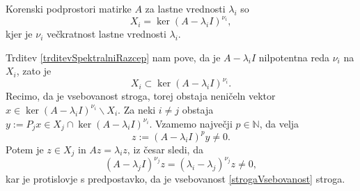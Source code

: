 \documentclass[mat1]{fmfdelo}
\newcommand{\N}{\mathbb N}
\begin{document}
\begin{trditev}
    Korenski podprostori matirke $A$ za lastne vrednosti $\lambda_i$ so
    \begin{equation}
        X_i = \ker (A - \lambda_i I)^{\nu_i},
    \end{equation}
    kjer je $\nu_i$ večkratnost lastne vrednosti $\lambda_i$.
\end{trditev}
\begin{dokaz}
    Trditev \ref{trditevSpektralniRazcep} nam pove, da je $A - \lambda_i I$ nilpotentna reda $\nu_i$ na $X_i$, zato je
    \begin{equation} \label{strogaVsebovanost}
        X_i \subset \ker (A - \lambda_i I)^{\nu_i}.
    \end{equation}
    Recimo, da je vsebovanost stroga, torej obstaja neničeln vektor $x \in \ker (A - \lambda_i I)^{\nu_i} \backslash X_i$. Za neki $i \neq j$ obstaja $y := P_j x \in X_j \cap \ker (A - \lambda_i I)^{\nu_i}$. Vzamemo največji $p \in \N$, da velja
    \begin{equation}
        z := (A - \lambda_i I)^p y \neq 0.
    \end{equation}
    Potem je $z \in X_j$ in $A z = \lambda_i z$, iz česar sledi, da
    \begin{equation}
        (A - \lambda_j I)^{\nu_j} z = (\lambda_i - \lambda_j)^{\nu_j} z \neq 0,
    \end{equation}
    kar je protislovje s predpostavko, da je vsebovanost \eqref{strogaVsebovanost} stroga.
\end{dokaz}
\end{document}
